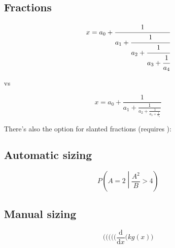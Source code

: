 \subsection*{Fractions}

\begin{example}
\[
x = a_0 + \cfrac{1}{a_1 
          + \cfrac{1}{a_2 
            + \cfrac{1}{a_3 +\cfrac{1}{a_4} } } }
\]
\end{example}

vs
    
\begin{example}
\[
x = a_0 + \frac{1}{a_1 
          + \frac{1}{a_2 
            + \frac{1}{a_3 + \frac{1}{a_4} } } }
\]
\end{example}

There's also the option for slanted fractions (requires ):\\

\subsection*{Automatic sizing}
\begin{example}
\[
P\left(A=2\middle|\frac{A^2}{B}>4\right)
\]
\end{example}

\subsection*{Manual sizing}
\begin{example}
\[
  ( \big( \Big( \bigg( \Bigg(
  \frac{\mathrm d}{\mathrm d x} \big( k g(x) \big)
\]
\end{example}

